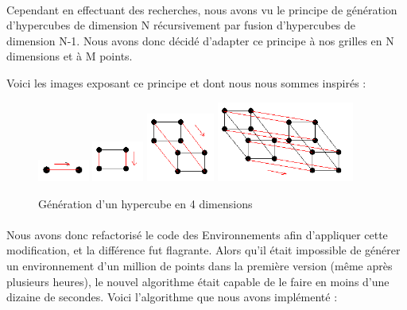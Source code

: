 \documentclass[pidr]{tnreport}
\begin{document}
\paragraph{}
Cependant en effectuant des recherches, nous avons vu le principe de génération d'hypercubes de dimension N récursivement par fusion d'hypercubes de dimension N-1. Nous avons donc décidé d'adapter ce principe à nos grilles en N dimensions et à M points.

Voici les images exposant ce principe et dont nous nous sommes inspirés : 

\begin{figure}[H]
    \includegraphics[width=0.15\textwidth]{./figures/Hypercube-dim1.PNG}
    \includegraphics[width=0.15\textwidth]{./figures/Hypercube-dim2.PNG}
    \includegraphics[width=0.2\textwidth]{./figures/Hypercube-dim3.PNG}
    \includegraphics[width=0.4\textwidth]{./figures/Hypercube-dim4.PNG}
    \caption{Génération d'un hypercube en 4 dimensions}
\end{figure}

\paragraph{}
Nous avons donc refactorisé le code des Environnements afin d'appliquer cette modification, et la différence fut flagrante. Alors qu'il était impossible de générer un environnement d'un million de points dans la première version (même après plusieurs heures), le nouvel algorithme était capable de le faire en moins d'une dizaine de secondes. \newline
Voici l'algorithme que nous avons implémenté : 
\end{document}
